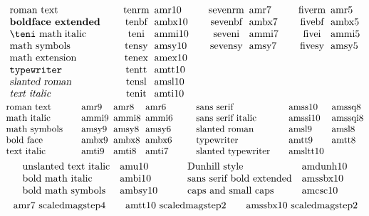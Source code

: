 \vskip-20pt
$$\vbox{\halign{#\hfil \qquad&#\hfil\enskip&#\hfil\qquad&
#\hfil\enskip&#\hfil\qquad&#\hfil&\enskip#\hfil\cr
\rm roman text&\\tenrm&amr10&\\sevenrm&amr7&\\fiverm&amr5\cr
\bf boldface extended&\\tenbf&ambx10&\\sevenbf&ambx7&\\fivebf&ambx5\cr
\teni math$\;$italic&\\teni&ammi10&\\seveni&ammi7&\\fivei&ammi5\cr
math symbols&\\tensy&amsy10&\\sevensy&amsy7&\\fivesy&amsy5\cr
math extension&\\tenex&amex10\cr
\tt typewriter&\\tentt&amtt10\cr
\sl slanted roman&\\tensl&amsl10\cr
\it text italic&\\tenit&amti10\cr}}$$
$$\vbox{\halign{#\hfil\qquad&#\hfil\enskip&#\hfil\enskip&#\hfil\qquad\enskip&
#\hfil\qquad&#\hfil \enskip&#\hfil\cr
roman text&amr9&amr8&amr6&sans serif&amss10&amssq8\cr
math italic&ammi9&ammi8&ammi6&sans serif italic&amssi10&amssqi8\cr
math symbols&amsy9&amsy8&amsy6&slanted roman&amsl9&amsl8\cr
bold face&ambx9&ambx8&ambx6&typewriter&amtt9&amtt8\cr
text italic&amti9&amti8&amti7&slanted typewriter&amsltt10 \cr}}$$
$$\vbox{\halign{#\hfil\quad&#\hfil\qquad\quad&#\hfil\quad&#\hfil\cr
unslanted text italic&amu10&Dunhill style&amdunh10\cr
bold math italic&ambi10&
sans serif bold extended&amssbx10\cr
bold math symbols&ambsy10&
caps and small caps&amcsc10\cr}}$$\medskip
{}
\vskip -20pt
$$\vbox{\halign{#\hfil\qquad&#\hfil\qquad&#\hfil\cr
amr7 scaled \\magstep4&
amtt10 scaled \\magstep2&
amssbx10 scaled \\magstep2\cr}}$$

